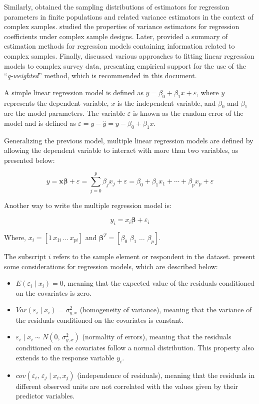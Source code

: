 \documentclass[
  12pt,
]{book}
\providecommand{\tightlist}{%
  \setlength{\itemsep}{0pt}\setlength{\parskip}{0pt}}
\begin{document}
Similarly, \citet{binder1983variances} obtained the sampling distributions of estimators for regression parameters in finite populations and related variance estimators in the context of complex samples. \citet{skinner1989analysis} studied the properties of variance estimators for regression coefficients under complex sample designs. Later, \citet{fuller2002regression} provided a summary of estimation methods for regression models containing information related to complex samples. Finally, \citet{pfeffermann2011modelling} discussed various approaches to fitting linear regression models to complex survey data, presenting empirical support for the use of the ``\emph{q-weighted}'' method, which is recommended in this document.

A simple linear regression model is defined as \(y=\beta_{0}+\beta_{1}x+\varepsilon\), where \(y\) represents the dependent variable, \(x\) is the independent variable, and \(\beta_{0}\) and \(\beta_{1}\) are the model parameters. The variable \(\varepsilon\) is known as the random error of the model and is defined as \(\varepsilon=y-\hat{y}=y-\beta_{0}+\beta_{1}x\).

Generalizing the previous model, multiple linear regression models are defined by allowing the dependent variable to interact with more than two variables, as presented below:

\[
y  =  \boldsymbol{x}\boldsymbol{\beta}+\varepsilon
  =  \sum_{j=0}^{p}\beta_{j}x_{j}+\varepsilon
 =  \beta_{0}+\beta_{1}x_{1}+\cdots+\beta_{p}x_{p}+\varepsilon
\]

Another way to write the multiple regression model is:

\[
y_{i}  =  x_{i}\boldsymbol{\beta}+\varepsilon_{i}
\]

Where, \(x_{i}=\left[1\,x_{1i}\,\ldots\,x_{pi}\right]\) and \(\boldsymbol{\beta}^{T}=\left[\beta_{0}\,\,\beta_{1}\,\,\ldots\,\,\beta_{p}\right]\).

The subscript \(i\) refers to the sample element or respondent in the dataset. \citet{Heeringa_West_Berglund_2017} present some considerations for regression models, which are described below:

\begin{itemize}
\tightlist
\item
  \(E\left(\varepsilon_{i}\mid x_{i}\right)=0\), meaning that the expected value of the residuals conditioned on the covariates is zero.
\item
  \(Var\left(\varepsilon_{i}\mid x_{i}\right)=\sigma_{y,x}^{2}\) (homogeneity of variance), meaning that the variance of the residuals conditioned on the covariates is constant.
\item
  \(\varepsilon_{i}\mid x_{i}\sim N\left(0,\,\sigma_{y,x}^{2}\right)\) (normality of errors), meaning that the residuals conditioned on the covariates follow a normal distribution. This property also extends to the response variable \(y_{i}\).
\item
  \(cov\left(\varepsilon_{i},\,\varepsilon_{j}\mid x_{i},x_{j}\right)\) (independence of residuals), meaning that the residuals in different observed units are not correlated with the values given by their predictor variables.
\end{itemize}
\end{document}
